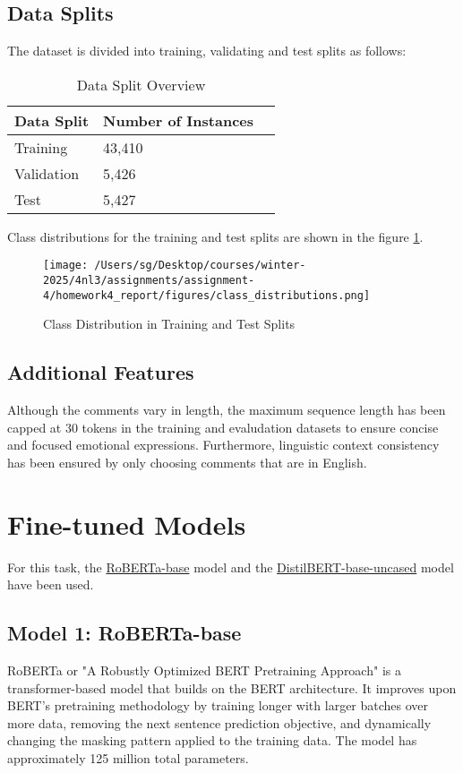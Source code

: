 \documentclass[titlepage]{article}
\begin{document}
\subsection{Data Splits}
The dataset is divided into training, validating and test splits as follows:

\begin{table}[H] \label{tab:data_split}
    \centering
    \begin{tabular}{lll}
    \toprule
    \textbf{Data Split} & \textbf{Number of Instances} \\
    \midrule
    Training & 43,410 \\
    Validation & 5,426 \\
    Test & 5,427 \\
    \bottomrule
    \end{tabular}
    \caption{Data Split Overview}
\end{table}

Class distributions for the training and test splits are shown in the figure \ref{fig:class_distribution}.

\begin{figure}[H] \label{fig:class_distribution}
    \centering
    \texttt{[image: /Users/sg/Desktop/courses/winter-2025/4nl3/assignments/assignment-4/homework4\_report/figures/class\_distributions.png]}
    \caption{Class Distribution in Training and Test Splits}
\end{figure}

\subsection{Additional Features}
Although the comments vary in length, the maximum sequence length has been capped at 30 tokens in the training and evaludation datasets 
to ensure concise and focused emotional expressions. Furthermore, linguistic context consistency has been ensured by only choosing comments 
that are in English.
 
\section{Fine-tuned Models}
For this task, the \href{https://huggingface.co/FacebookAI/roberta-base}{RoBERTa-base} model and the \href{https://huggingface.co/distilbert/distilbert-base-uncased}
{DistilBERT-base-uncased} model have been used. 

\subsection{Model 1: RoBERTa-base}
RoBERTa or "A Robustly Optimized BERT Pretraining Approach" is a transformer-based model that builds on the BERT architecture. It improves upon 
BERT's pretraining methodology by training longer with larger batches over more data, removing the next sentence prediction objective, and dynamically 
changing the masking pattern applied to the training data. The model has approximately 125 million total parameters. 
\end{document}
